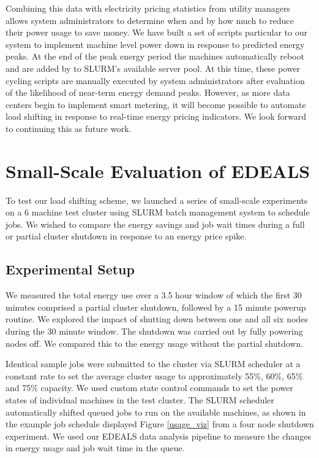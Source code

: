 \documentclass[letterpaper,twocolumn,10pt]{article}
\begin{document}
Combining this data with electricity pricing statistics from utility managers allows system administrators to determine when and by how much to reduce their power usage to save money.  We have built a set of scripts particular to our system to implement machine level power down in response to predicted energy peaks.  At the end of the peak energy period the machines automatically reboot and are added by to SLURM’s available server pool.  At this time, these power cycling scripts are manually executed by system administrators after evaluation of the likelihood of near-term energy demand peaks.  However, as more data centers begin to implement smart metering, it will become possible to automate load shifting in response to real-time energy pricing indicators.  We look forward to continuing this as future work.





\section{Small-Scale Evaluation of EDEALS}

To test our load shifting scheme, we launched a series of small-scale experiments on a 6 machine test cluster using SLURM batch management system to schedule jobs. We wished to compare the energy savings and job wait times during a full or partial cluster shutdown in response to an energy price spike.

\subsection{Experimental Setup}

We measured the total energy use over a 3.5 hour window of which the first 30 minutes comprised a partial cluster shutdown, followed by a 15 minute powerup routine. We explored the impact of shutting down between one and all six nodes during the 30 minute window. The shutdown was carried out by fully powering nodes off.  We compared this to the energy usage without the partial shutdown.

Identical sample jobs were submitted to the cluster via SLURM scheduler at a constant rate to set the average cluster usage to approximately 55\%, 60\%, 65\% and 75\% capacity.  We used custom state control commands to set the power states of individual machines in the test cluster.  The SLURM scheduler automatically shifted queued jobs to run on the available machines, as shown in the example job schedule displayed Figure \ref{usage_viz} from a four node shutdown experiment. We used our EDEALS data analysis pipeline to measure the changes in energy usage and job wait time in the queue.
\end{document}
